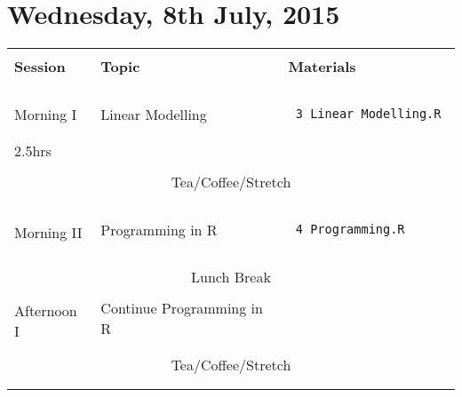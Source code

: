 \documentclass{article}[12pt]
\begin{document}
\section*{Wednesday, 8th July, 2015}
\begin{table}[h!]
\begin{tabular}{ |p{2cm}|p{4cm}|p{7cm}| }
\hline
                               &                              & \\
\textbf{Session}               & \textbf{Topic}               & \textbf{Materials} \\ 
                               &                              & \\ \hline \hline
 & & \\
Morning I                   & Linear Modelling                & \begin{verbatim} 3_Linear_Modelling.R \end{verbatim} \\ %
2.5hrs                         &                              &  \\ \hline
\multicolumn{3}{c}{} \\ 
\multicolumn{3}{c}{Tea/Coffee/Stretch}  \\ 
\multicolumn{3}{c}{} \\ \hline
 & & \\
\multirow{2}{*}{Morning II}    & Programming in R             & \begin{verbatim} 4_Programming.R \end{verbatim} \\
                               &                              &  \\ \hline
\multicolumn{3}{c}{} \\ 
\multicolumn{3}{c}{Lunch Break}  \\ 
\multicolumn{3}{c}{} \\ \hline
\multirow{2}{*}{Afternoon I}   & Continue Programming in R    &  \\
                               &                              &  \\ \hline
\multicolumn{3}{c}{} \\
\multicolumn{3}{c}{Tea/Coffee/Stretch}  \\ 
\multicolumn{3}{c}{} \\ \hline
                               &                              & \\

\end{tabular}
\end{table}
\end{document}
